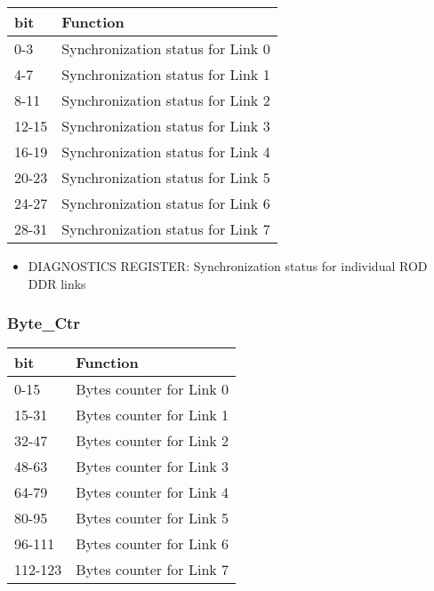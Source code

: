 \begin {table}[H]
\begin{center}
\begin{tabular}{|l|l|}
\hline
\textbf{bit} & \textbf{Function} \\
\hline
0-3 & Synchronization status for Link 0 \\
\hline
4-7 & Synchronization status for Link 1 \\
\hline
8-11 & Synchronization status for Link 2 \\
\hline
12-15 & Synchronization status for Link 3 \\
\hline
16-19 & Synchronization status for Link 4 \\
\hline
20-23 & Synchronization status for Link 5 \\
\hline
24-27 & Synchronization status for Link 6 \\
\hline
28-31 & Synchronization status for Link 7 \\
\hline
\end{tabular}
\end{center}
\end{table}


\begin{itemize}
\item DIAGNOSTICS REGISTER: Synchronization status for individual ROD DDR links
\end{itemize}




\subsubsection{Byte\_Ctr}

\begin {table}[H]
\begin{center}
\begin{tabular}{|l|l|}
\hline
\textbf{bit} & \textbf{Function} \\
\hline
0-15 & Bytes counter for Link 0 \\
\hline
15-31 & Bytes counter for Link 1 \\
\hline
32-47 & Bytes counter for Link 2 \\
\hline
48-63 & Bytes counter for Link 3 \\
\hline
64-79 & Bytes counter for Link 4 \\
\hline
80-95 & Bytes counter for Link 5 \\
\hline
96-111 & Bytes counter for Link 6 \\
\hline
112-123 & Bytes counter for Link 7 \\
\hline
\end{tabular}
\end{center}
\end{table}


